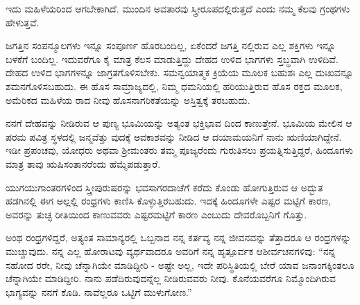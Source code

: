 ಇದು ಮಹಿಳೆಯರಿಂದ ಆಗಬೇಕಾಗಿದೆ. ಮುಂದಿನ ಅವತಾರವು ಸ್ತ್ರೀರೂಪದಲ್ಲಿರುತ್ತದೆ ಎಂದು ನಮ್ಮ ಕೆಲವು ಗ್ರಂಥಗಳು ಹೇಳುತ್ತವೆ.

ಜಗತ್ತಿನ ಸಂಪನ್ಮೂಲಗಳು ಇನ್ನೂ ಸಂಪೂರ್ಣ ಹೊರಬಂದಿಲ್ಲ, ಏಕೆಂದರೆ ಜಗತ್ತಿ ನಲ್ಲಿರುವ ಎಲ್ಲ ಶಕ್ತಿಗಳು ಇನ್ನೂ ಬಳಕೆಗೆ ಬಂದಿಲ್ಲ. ಇದುವರೆಗೂ ಕೈ ಮಾತ್ರ ಕೆಲಸ ಮಾಡುತ್ತಿದ್ದು ದೇಹದ ಉಳಿದ ಭಾಗಗಳು ಸ್ತಬ್ಧವಾಗಿ ಉಳಿದಿವೆ. ದೇಹದ ಉಳಿದ ಭಾಗಗಳನ್ನೂ ಜಾಗ್ರತಗೊಳಿಸಬೇಕು. ಸಮನ್ವಯಾತ್ಮಕ ಕ್ರಿಯೆಯ ಮೂಲಕ ಬಹುಶಃ ಎಲ್ಲ ದುಃಖವನ್ನೂ ಶಮನಗೊಳಿಸಬಹುದು. ಈ ಹೊಸ ಸಾಮ್ರಾಜ್ಯದಲ್ಲಿ, ನಿಮ್ಮ ಧಮನಿಯಲ್ಲಿ ಹರಿಯುತ್ತಿರುವ ಹೊಸ ರಕ್ತದ ಮೂಲಕ, ಅಮೆರಿಕದ ಮಹಿಳೆಯ ರಾದ ನೀವು ಹೊಸನಾಗರಿಕತೆಯನ್ನು ಅಸ್ತಿತ್ವಕ್ಕೆ ತರಬಹುದು.

ನನಗೆ ದೇಹವನ್ನು ನೀಡಿರುವ ಆ ಪುಣ್ಯ ಭೂಮಿಯನ್ನು ಅತ್ಯಂತ ಭಕ್ತಿಭಾವ ದಿಂದ ಕಾಣುತ್ತೇನೆ. ಭೂಮಿಯ ಮೇಲಿನ ಆ ಪರಮ ಪವಿತ್ರ ಸ್ಥಳದಲ್ಲಿ ಜನ್ಮವೆತ್ತು ವುದಕ್ಕೆ ಅವಕಾಶವನ್ನು ನೀಡಿದ ಆ ದಯಾಮಯನಿಗೆ ನಾನು ಋಣಿಯಾಗಿದ್ದೇನೆ. ಇಡೀ ಪ್ರಪಂಚವು, ಯೋಧರು ಅಥವಾ ಶ‍್ರೀಮಂತರು ತಮ್ಮ ಪೂಜ್ಯರೆಂದು ಗುರುತಿಸಲು ಪ್ರಯತ್ನಿಸುತ್ತಿದ್ದರೆ, ಹಿಂದೂಗಳು ಮಾತ್ರ ತಾವು ಋಷಿಸಂತಾನರೆಂದು ಹೆಮ್ಮೆಪಡುತ್ತಾರೆ.

ಯುಗಯುಗಾಂತರಗಳಿಂದ ಸ್ತ್ರೀಪುರುಷರನ್ನು ಭವಸಾಗರದಾಚೆಗೆ ಕರೆದು ಕೊಂಡು ಹೋಗುತ್ತಿರುವ ಆ ಅದ್ಭುತ ಹಡಗಿನಲ್ಲಿ ಈಗ ಅಲ್ಲಲ್ಲಿ ರಂಧ್ರಗಳು ಕಾಣಿಸಿ ಕೊಳ್ಳುತ್ತಿರಬಹುದು. ಇದಕ್ಕೆ ಹಿಂದೂಗಳೇ ಎಷ್ಟರ ಮಟ್ಟಿಗೆ ಕಾರಣ, ಅವರನ್ನು ತುಚ್ಛ ರೀತಿಯಿಂದ ಕಾಣುವವರು ಎಷ್ಟರಮಟ್ಟಿಗೆ ಕಾರಣ ಎಂಬುದು ದೇವರೊಬ್ಬನಿಗೆ ಗೊತ್ತು.

ಅಂಥ ರಂಧ್ರಗಳಿದ್ದರೆ, ಅತ್ಯಂತ ಸಾಮಾನ್ಯರಲ್ಲಿ ಒಬ್ಬನಾದ ನನ್ನ ಕರ್ತವ್ಯ ನನ್ನ ಜೀವನವನ್ನು ತೆತ್ತಾದರೂ ಆ ರಂಧ್ರಗಳನ್ನು ಮುಚ್ಚುವುದು. ನನ್ನ ಎಲ್ಲ ಹೋರಾಟವು ವ್ಯರ್ಥವಾದರೂ ಅವರಿಗೆ ನನ್ನ ಹೃತ್ಪೂರ್ವಕ ಆಶೀರ್ವಚನಗಳಿವು: “ನನ್ನ ಸಹೋದ ರರೇ, ನೀವು ಚೆನ್ನಾಗಿಯೇ ಮಾಡಿದ್ದೀರಿ - ಅಷ್ಟೇ ಅಲ್ಲ, ಇದೇ ಪರಿಸ್ಥಿತಿಯಲ್ಲಿ ಬೇರೆ ಯಾವ ಜನಾಂಗಕ್ಕಿಂತಲೂ ಚೆನ್ನಾಗಿಯೇ ಮಾಡಿದ್ದೀರಿ. ನಾನು ಪಡೆದಿರುವುದನ್ನೆಲ್ಲ ನೀಡಿರುವವರು ನೀವು. ಕೊನೆಯವರೆಗೂ ನಿಮ್ಮೊಂದಿಗಿರುವ ಭಾಗ್ಯವನ್ನು ನನಗೆ ಕೊಡಿ. ನಾವೆಲ್ಲರೂ ಒಟ್ಟಿಗೆ ಮುಳುಗೋಣ.”

